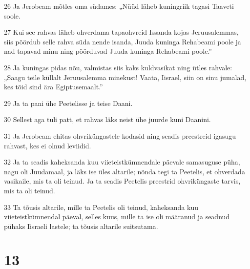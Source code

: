 \par 26 Ja Jerobeam mõtles oma südames: „Nüüd läheb kuningriik tagasi Taaveti soole.
\par 27 Kui see rahvas läheb ohverdama tapaohvreid Issanda kojas Jeruusalemmas, siis pöördub selle rahva süda nende isanda, Juuda kuninga Rehabeami poole ja nad tapavad minu ning pöörduvad Juuda kuninga Rehabeami poole.”
\par 28 Ja kuningas pidas nõu, valmistas siis kaks kuldvasikat ning ütles rahvale: „Saagu teile küllalt Jeruusalemma minekust! Vaata, Iisrael, siin on sinu jumalad, kes tõid sind ära Egiptusemaalt.”
\par 29 Ja ta pani ühe Peetelisse ja teise Daani.
\par 30 Sellest aga tuli patt, et rahvas läks neist ühe juurde kuni Daanini.
\par 31 Ja Jerobeam ehitas ohvriküngastele kodasid ning seadis preestreid igasugu rahvast, kes ei olnud leviidid.
\par 32 Ja ta seadis kaheksanda kuu viieteistkümnendale päevale samasuguse püha, nagu oli Juudamaal, ja läks ise üles altarile; nõnda tegi ta Peetelis, et ohverdada vasikaile, mis ta oli teinud. Ja ta seadis Peetelis preestrid ohvriküngaste tarvis, mis ta oli teinud.
\par 33 Ta tõusis altarile, mille ta Peetelis oli teinud, kaheksanda kuu viieteistkümnendal päeval, selles kuus, mille ta ise oli määranud ja seadnud pühaks Iisraeli lastele; ta tõusis altarile suitsutama.

\chapter{13}

